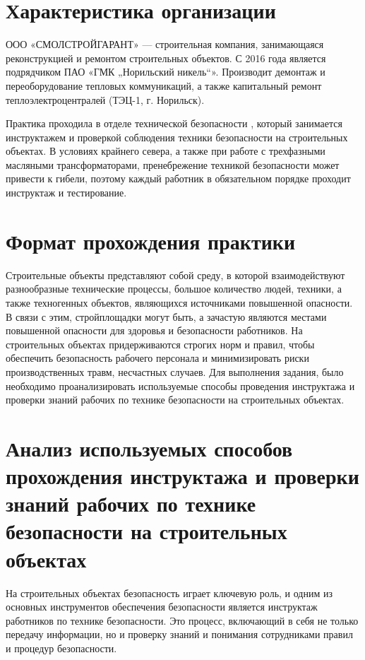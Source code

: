 \section{Характеристика организации}

ООО «СМОЛСТРОЙГАРАНТ» — строительная компания, занимающаяся реконструкцией и ремонтом строительных объектов. С 2016 года является подрядчиком ПАО «ГМК „Норильский никель“». Производит демонтаж и переоборудование тепловых коммуникаций, а также капитальный ремонт теплоэлектроцентралей  (ТЭЦ-1, г. Норильск).  

Практика проходила в отделе технической безопасности \cite{safety}, который занимается инструктажем и проверкой соблюдения техники безопасности на строительных объектах. В условиях крайнего севера, а также при работе с трехфазными масляными трансформаторами, пренебрежение техникой безопасности может привести к гибели, поэтому каждый работник в обязательном порядке проходит инструктаж и тестирование. 


\section{Формат прохождения практики}

Строительные объекты представляют собой среду, в которой взаимодействуют разнообразные технические процессы, большое количество людей, техники, а также техногенных объектов, являющихся источниками повышенной опасности. В связи с этим, стройплощадки могут быть, а зачастую являются местами повышенной опасности для здоровья и безопасности работников. На строительных объектах придерживаются строгих норм и правил, чтобы обеспечить безопасность рабочего персонала и минимизировать риски производственных травм, несчастных случаев.  Для выполнения задания, было необходимо проанализировать используемые способы проведения инструктажа и проверки знаний рабочих по технике безопасности на строительных объектах. 


\section{Анализ используемых способов прохождения инструктажа и проверки знаний рабочих по технике безопасности на строительных объектах}

На строительных объектах безопасность играет ключевую роль, и одним из основных инструментов обеспечения безопасности является инструктаж работников по технике безопасности. Это процесс, включающий в себя не только передачу информации, но и проверку знаний и понимания сотрудниками правил и процедур безопасности.  

